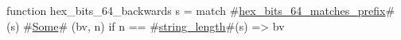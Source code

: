 function hex_bits_64_backwards s =
  match #\hyperref[sailRISCVzhexzybitszy64zymatcheszyprefix]{hex\_bits\_64\_matches\_prefix}#(s) {
      #\hyperref[sailRISCVzSome]{Some}# (bv, n) if n == #\hyperref[sailRISCVzstringzylength]{string\_length}#(s) => bv
  }
